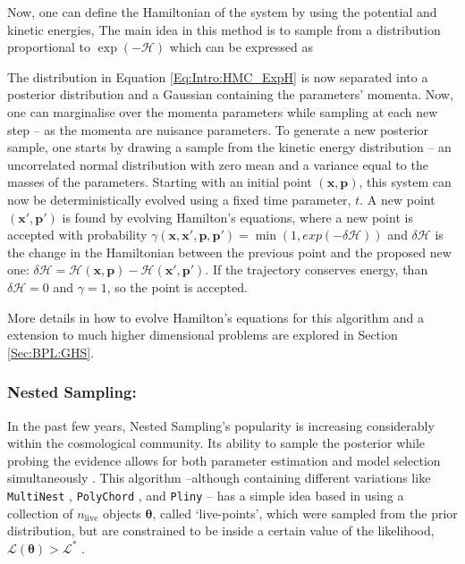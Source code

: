 \qquad Now, one can define the Hamiltonian of the system by using the potential and kinetic energies,
The main idea in this method is to sample from a distribution proportional to $\exp(-\mathcal{H})$ which can be expressed as

\qquad The distribution in Equation \eqref{Eq:Intro:HMC_ExpH} is now separated into a posterior distribution and a Gaussian containing the parameters' momenta. Now, one can marginalise over the momenta parameters while sampling at each new step -- as the momenta are nuisance parameters. To generate a new posterior sample, one starts by drawing a sample from the kinetic energy distribution -- an uncorrelated normal distribution with zero mean and a variance equal to the masses of the parameters. Starting with an initial point $(\bm{x}, \bm{p})$, this system can now be deterministically evolved using a fixed time parameter, $t$. A new point $(\bm{x}', \bm{p}')$ is found by evolving Hamilton's equations,
where a new point is accepted with probability $\gamma(\bm{x}, \bm{x}', \bm{p}, \bm{p}') = \min(1, exp(-\delta\mathcal{H}))$ and $\delta\mathcal{H}$ is the change in the Hamiltonian between the previous point and the proposed new one: $\delta\mathcal{H} = \mathcal{H}(\bm{x}, \bm{p}) - \mathcal{H}(\bm{x}', \bm{p}')$. If the trajectory conserves energy, than $\delta\mathcal{H} = 0$ and $\gamma =1$, so the point is accepted. 

\qquad More details in how to evolve Hamilton's equations for this algorithm and a extension to much higher dimensional problems are explored in Section \ref{Sec:BPL:GHS}.

\subsubsection{Nested Sampling:}
In the past few years, Nested Sampling's popularity is increasing considerably within the cosmological community. Its ability to sample the posterior while probing the evidence allows for both parameter estimation and model selection simultaneously \citep{2004NestedSampling}. This algorithm --although containing different variations like \texttt{MultiNest} \citep{2009Multinest}, \texttt{PolyChord} \citep{2015PolyChord}, and \texttt{Pliny} \citep{PlinyRichardThesis} -- has a simple idea based in using a collection of $n_{\text{live}}$ objects $\bm{\theta}$, called `live-points', which were sampled from the prior distribution, but are constrained to be inside a certain value of the likelihood, $\mathcal{L}(\bm{\theta}) > \mathcal{L}^*$ \citep{sivia2006data}.

